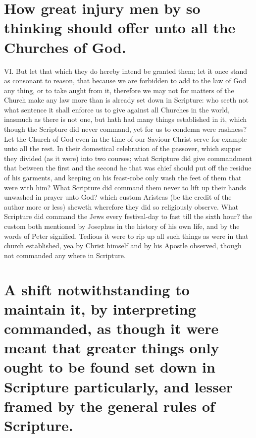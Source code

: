 \section*{How great injury men by so thinking should offer unto all the Churches of God.}

VI. But let that which they do hereby intend be granted them; let it once stand as consonant to reason, that because we are forbidden to add to the law of God any thing, or to take aught from it, therefore we may not for matters of the Church make any law more than is already set down in Scripture: who seeth not what sentence it shall enforce us to give against all Churches in the world, inasmuch as there is not one, but hath had many things established in it, which though the Scripture did never command, yet for us to condemn were rashness? Let the Church of God even in the time of our Saviour Christ serve for example unto all the rest. In their domestical celebration of the passover, which supper they divided (as it were) into two courses; what Scripture did give commandment that between the first and the second he that was chief should put off the residue of his garments, and keeping on his feast-robe only wash the feet of them that were with him? What Scripture did command them never to lift up their hands unwashed in prayer unto God? which custom Aristeas (be the credit of the author more or less) sheweth wherefore they did so religiously observe. What Scripture did command the Jews every festival-day to fast till the sixth hour? the custom both  mentioned by Josephus in the history of his own life, and by the words of Peter signified. Tedious it were to rip up all such things as were in that church established, yea by Christ himself and by his Apostle observed, though not commanded any where in Scripture.

\section*{A shift notwithstanding to maintain it, by interpreting commanded, as though it were meant that greater things only ought to be found set down in Scripture particularly, and lesser framed by the general rules of Scripture.}


